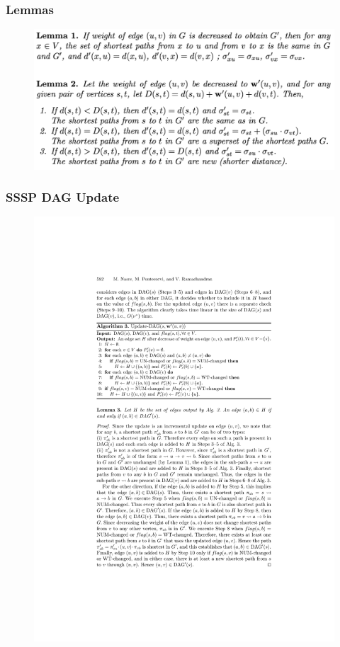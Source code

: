 \begin{frame}
  \frametitle{Lemmas}

  \begin{figure}[H]
    \centering
    \includegraphics[width=\textwidth]{imgs/npr14-lemmas}
  \end{figure}
\end{frame}


\begin{frame}
  \frametitle{SSSP DAG Update}

  \begin{figure}[H]
    \centering
    \includegraphics[width=\textwidth]{imgs/npr14-algo3}
  \end{figure}
\end{frame}


